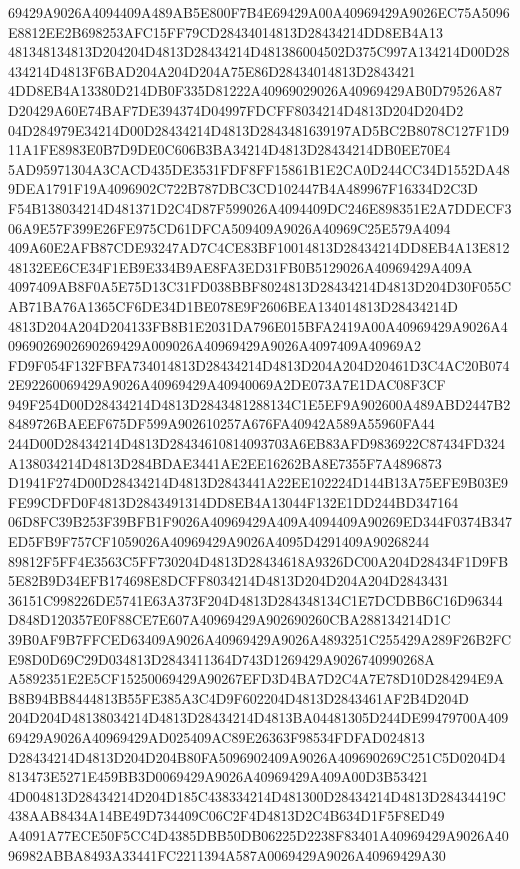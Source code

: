 \documentclass[UTF8,fontset=fandol,zihao=-4,a4paper]{ctexart}
\begin{document}
{{69429A9026A4094409A489AB5E800F7B4E69429A00A40969429A9026EC75A5096E8812EE2B698253AFC15FF79CD28434014813D28434214DD8EB4A13
481348134813D204204D4813D28434214D481386004502D375C997A134214D00D28434214D4813F6BAD204A204D204A75E86D28434014813D2843421
4DD8EB4A13380D214DB0F335D81222A40969029026A40969429AB0D79526A87D20429A60E74BAF7DE394374D04997FDCFF8034214D4813D204D204D2
04D284979E34214D00D28434214D4813D2843481639197AD5BC2B8078C127F1D911A1FE8983E0B7D9DE0C606B3BA34214D4813D28434214DB0EE70E4
5AD95971304A3CACD435DE3531FDF8FF15861B1E2CA0D244CC34D1552DA489DEA1791F19A4096902C722B787DBC3CD102447B4A489967F16334D2C3D
F54B138034214D481371D2C4D87F599026A4094409DC246E898351E2A7DDECF306A9E57F399E26FE975CD61DFCA509409A9026A40969C25E579A4094
409A60E2AFB87CDE93247AD7C4CE83BF10014813D28434214DD8EB4A13E81248132EE6CE34F1EB9E334B9AE8FA3ED31FB0B5129026A40969429A409A
4097409AB8F0A5E75D13C31FD038BBF8024813D28434214D4813D204D30F055CAB71BA76A1365CF6DE34D1BE078E9F2606BEA134014813D28434214D
4813D204A204D204133FB8B1E2031DA796E015BFA2419A00A40969429A9026A40969026902690269429A009026A40969429A9026A4097409A40969A2
FD9F054F132FBFA734014813D28434214D4813D204A204D20461D3C4AC20B0742E92260069429A9026A40969429A40940069A2DE073A7E1DAC08F3CF
949F254D00D28434214D4813D2843481288134C1E5EF9A902600A489ABD2447B28489726BAEEF675DF599A902610257A676FA40942A589A55960FA44
244D00D28434214D4813D28434610814093703A6EB83AFD9836922C87434FD324A138034214D4813D284BDAE3441AE2EE16262BA8E7355F7A4896873
D1941F274D00D28434214D4813D2843441A22EE102224D144B13A75EFE9B03E9FE99CDFD0F4813D2843491314DD8EB4A13044F132E1DD244BD347164
06D8FC39B253F39BFB1F9026A40969429A409A4094409A90269ED344F0374B347ED5FB9F757CF1059026A40969429A9026A4095D4291409A90268244
89812F5FF4E3563C5FF730204D4813D28434618A9326DC00A204D28434F1D9FB5E82B9D34EFB174698E8DCFF8034214D4813D204D204A204D2843431
36151C998226DE5741E63A373F204D4813D284348134C1E7DCDBB6C16D96344D848D120357E0F88CE7E607A40969429A902690260CBA288134214D1C
39B0AF9B7FFCED63409A9026A40969429A9026A4893251C255429A289F26B2FCE98D0D69C29D034813D2843411364D743D1269429A9026740990268A
A5892351E2E5CF15250069429A90267EFD3D4BA7D2C4A7E78D10D284294E9AB8B94BB8444813B55FE385A3C4D9F602204D4813D2843461AF2B4D204D
204D204D48138034214D4813D28434214D4813BA04481305D244DE99479700A40969429A9026A40969429AD025409AC89E26363F98534FDFAD024813
D28434214D4813D204D204B80FA5096902409A9026A409690269C251C5D0204D4813473E5271E459BB3D0069429A9026A40969429A409A00D3B53421
4D004813D28434214D204D185C438334214D481300D28434214D4813D28434419C438AAB8434A14BE49D734409C06C2F4D4813D2C4B634D1F5F8ED49
A4091A77ECE50F5CC4D4385DBB50DB06225D2238F83401A40969429A9026A4096982ABBA8493A33441FC2211394A587A0069429A9026A40969429A30
}}
\end{document}
